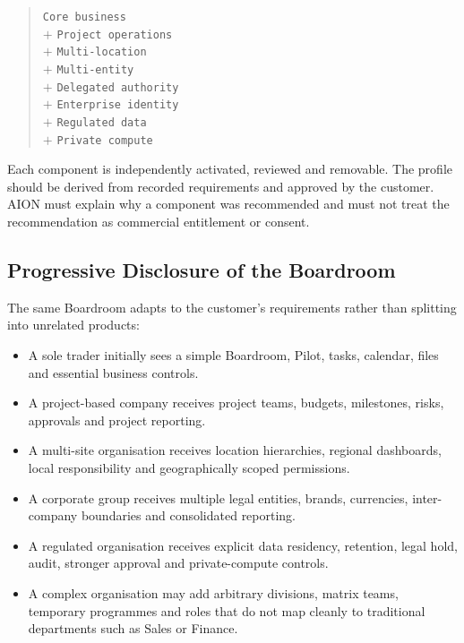 \begin{quote}
\texttt{Core business} \\
$+$ \texttt{Project operations} \\
$+$ \texttt{Multi-location} \\
$+$ \texttt{Multi-entity} \\
$+$ \texttt{Delegated authority} \\
$+$ \texttt{Enterprise identity} \\
$+$ \texttt{Regulated data} \\
$+$ \texttt{Private compute}
\end{quote}

Each component is independently activated, reviewed and removable.  The profile should be derived
from recorded requirements and approved by the customer.  AION must explain why a component was
recommended and must not treat the recommendation as commercial entitlement or consent.

\subsection{Progressive Disclosure of the Boardroom}

The same Boardroom adapts to the customer's requirements rather than splitting into unrelated
products:

\begin{itemize}
  \item A sole trader initially sees a simple Boardroom, Pilot, tasks, calendar, files and essential
        business controls.
  \item A project-based company receives project teams, budgets, milestones, risks, approvals and
        project reporting.
  \item A multi-site organisation receives location hierarchies, regional dashboards, local
        responsibility and geographically scoped permissions.
  \item A corporate group receives multiple legal entities, brands, currencies, inter-company
        boundaries and consolidated reporting.
  \item A regulated organisation receives explicit data residency, retention, legal hold, audit,
        stronger approval and private-compute controls.
  \item A complex organisation may add arbitrary divisions, matrix teams, temporary programmes and
        roles that do not map cleanly to traditional departments such as Sales or Finance.
\end{itemize}

